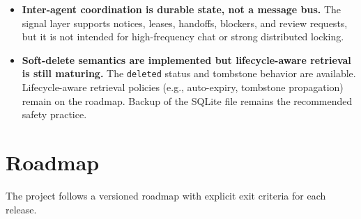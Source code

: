 \documentclass[11pt,a4paper]{article}
\begin{document}
\begin{itemize}
 \item \textbf{Inter-agent coordination is durable state, not a message bus.} The signal layer supports notices, leases, handoffs, blockers, and review requests, but it is not intended for high-frequency chat or strong distributed locking.
 \item \textbf{Soft-delete semantics are implemented but lifecycle-aware retrieval is still maturing.} The \texttt{deleted} status and tombstone behavior are available. Lifecycle-aware retrieval policies (e.g., auto-expiry, tombstone propagation) remain on the roadmap. Backup of the SQLite file remains the recommended safety practice.
\end{itemize}

\section{Roadmap}

The project follows a versioned roadmap with explicit exit criteria for each release.
\end{document}

